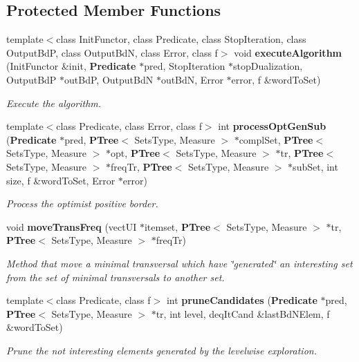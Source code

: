 \subsection*{Protected Member Functions}
\begin{CompactItemize}
\item 
template$<$class Init\-Functor, class Predicate, class Stop\-Iteration, class Output\-Bd\-P, class Output\-Bd\-N, class Error, class f$>$ void {\bf execute\-Algorithm} (Init\-Functor \&init, {\bf Predicate} $\ast$pred, Stop\-Iteration $\ast$stop\-Dualization, Output\-Bd\-P $\ast$out\-Bd\-P, Output\-Bd\-N $\ast$out\-Bd\-N, Error $\ast$error, f \&word\-To\-Set)
\begin{CompactList}\small\item\em Execute the algorithm. \item\end{CompactList}\item 
template$<$class Predicate, class Error, class f$>$ int {\bf process\-Opt\-Gen\-Sub} ({\bf Predicate} $\ast$pred, {\bf PTree}$<$ Sets\-Type, Measure $>$ $\ast$compl\-Set, {\bf PTree}$<$ Sets\-Type, Measure $>$ $\ast$opt, {\bf PTree}$<$ Sets\-Type, Measure $>$ $\ast$tr, {\bf PTree}$<$ Sets\-Type, Measure $>$ $\ast$freq\-Tr, {\bf PTree}$<$ Sets\-Type, Measure $>$ $\ast$sub\-Set, int size, f \&word\-To\-Set, Error $\ast$error)
\begin{CompactList}\small\item\em Process the optimist positive border. \item\end{CompactList}\item 
void {\bf move\-Trans\-Freq} (vect\-UI $\ast$itemset, {\bf PTree}$<$ Sets\-Type, Measure $>$ $\ast$tr, {\bf PTree}$<$ Sets\-Type, Measure $>$ $\ast$freq\-Tr)
\begin{CompactList}\small\item\em Method that move a minimal transversal which have \char`\"{}generated\char`\"{} an interesting set from the set of minimal transversals to another set. \item\end{CompactList}\item 
template$<$class Predicate, class f$>$ int {\bf prune\-Candidates} ({\bf Predicate} $\ast$pred, {\bf PTree}$<$ Sets\-Type, Measure $>$ $\ast$tr, int level, deq\-It\-Cand \&last\-Bd\-NElem, f \&word\-To\-Set)
\begin{CompactList}\small\item\em Prune the not interesting elements generated by the levelwise exploration. \item\end{CompactList}\item 

\end{CompactItemize}
